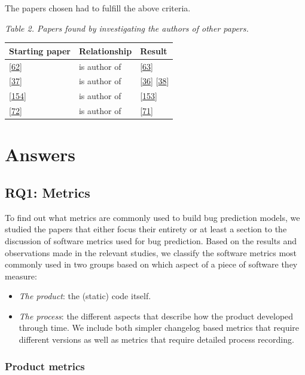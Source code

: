 \documentclass[]{book}
\providecommand{\tightlist}{%
  \setlength{\itemsep}{0pt}\setlength{\parskip}{0pt}}
\begin{document}
The papers chosen had to fulfill the above criteria.

\emph{Table 2. Papers found by investigating the authors of other
papers.}

\begin{longtable}[]{@{}lll@{}}
\toprule
Starting paper & Relationship & Result\tabularnewline
\midrule
\endhead
{[}\protect\hyperlink{ref-DAmbros2010}{62}{]} & is author of &
{[}\protect\hyperlink{ref-DAmbros2012}{63}{]}\tabularnewline
{[}\protect\hyperlink{ref-Catal2009review}{37}{]} & is author of &
{[}\protect\hyperlink{ref-Catal2011}{36}{]}
{[}\protect\hyperlink{ref-Catal2009investigating}{38}{]}\tabularnewline
{[}\protect\hyperlink{ref-rahman2011}{154}{]} & is author of &
{[}\protect\hyperlink{ref-Rahman2013}{153}{]}\tabularnewline
{[}\protect\hyperlink{ref-Giger2011}{72}{]} & is author of &
{[}\protect\hyperlink{ref-giger2012}{71}{]}\tabularnewline
\bottomrule
\end{longtable}

\section{Answers}\label{answers-1}

\subsection{RQ1: Metrics}\label{rq1-metrics}

To find out what metrics are commonly used to build bug prediction
models, we studied the papers that either focus their entirety or at
least a section to the discussion of software metrics used for bug
prediction. Based on the results and observations made in the relevant
studies, we classify the software metrics most commonly used in two
groups based on which aspect of a piece of software they measure:

\begin{itemize}
\tightlist
\item
  \emph{The product}: the (static) code itself.
\item
  \emph{The process}: the different aspects that describe how the
  product developed through time. We include both simpler changelog
  based metrics that require different versions as well as metrics that
  require detailed process recording.
\end{itemize}

\subsubsection{Product metrics}\label{product-metrics}
\end{document}
